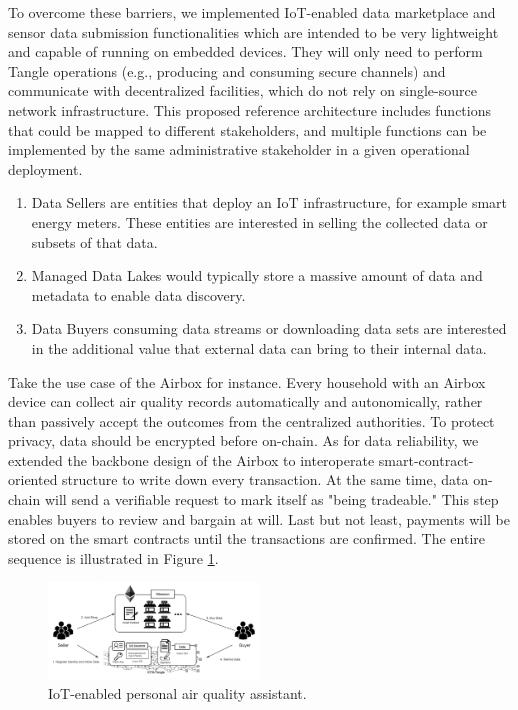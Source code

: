 \documentclass[journal,10pt,a4paper]{IEEEtran}
\begin{document}
To overcome these barriers, we implemented IoT-enabled data marketplace and sensor data submission functionalities which are intended to be very lightweight and capable of running on embedded devices. They will only need to perform Tangle operations (e.g., producing and consuming secure channels) and communicate with decentralized facilities, which do not rely on single-source network infrastructure. This proposed reference architecture includes functions that could be mapped to different stakeholders, and multiple functions can be implemented by the same administrative stakeholder in a given operational deployment.
\begin{enumerate}
    \item Data Sellers are entities that deploy an IoT infrastructure, for example smart energy meters. These entities are interested in selling the collected data or subsets of that data.
    \item Managed Data Lakes would typically store a massive amount of data and metadata to enable data discovery.
    \item Data Buyers consuming data streams or downloading data sets are interested in the additional value that external data can bring to their internal data.
\end{enumerate}

Take the use case of the Airbox\cite{LASS} for instance. Every household with an Airbox device can collect air quality records automatically and autonomically, rather than passively accept the outcomes from the centralized authorities. To protect privacy, data should be encrypted before on-chain. As for data reliability, we extended the backbone design of the Airbox to interoperate smart-contract-oriented structure to write down every transaction. At the same time, data on-chain will send a verifiable request to mark itself as "being tradeable." This step enables buyers to review and bargain at will. Last but not least, payments will be stored on the smart contracts until the transactions are confirmed. The entire sequence is illustrated in Figure \ref{fig:airbox}.

\begin{figure}[h]
    \centering
    \includegraphics[width=0.5\textwidth]{airbox}
    \caption{IoT-enabled personal air quality assistant.}
    \label{fig:airbox}
\end{figure}
\end{document}
